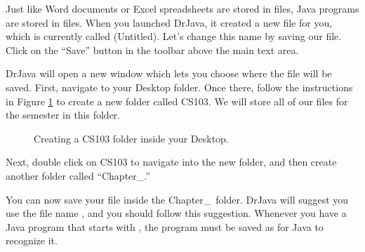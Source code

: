 Just like Word documents or Excel spreadsheets are stored in files, Java programs are stored in files. When you launched DrJava, it created a new file for you, which is currently called (Untitled). Let's change this name by saving our file. Click on the ``Save'' button in the toolbar above the main text area.

DrJava will open a new window which lets you choose where the file will be saved. First, navigate to your Desktop folder. Once there, follow the instructions in Figure \ref{fig:drjava_saving} to create a new folder called CS103. We will store all of our files for the semester in this folder. 

\begin{figure}[ht]
	\centering
	\caption{Creating a CS103 folder inside your Desktop.}
	\label{fig:drjava_saving}
\end{figure}

Next, double click on CS103 to navigate into the new folder, and then create another folder called ``Chapter\_\thechapter.''

You can now save your file inside the Chapter\_\thechapter\ folder. DrJava will suggest you use the file name , and you should follow this suggestion. Whenever you have a Java program that starts with , the program must be saved as  for Java to recognize it.

